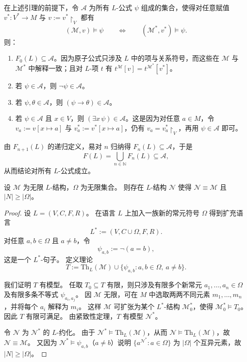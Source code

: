 \documentclass[lang=cn,a4paper,newtx,section]{elegantbook}
\begin{document}
 \begin{remark}
 在上述引理的前提下，令 $\mathcal A$ 为所有 $L$-公式 $\psi$ 组成的集合，使得对任意赋值 $v^*:V^*\to M$ 与 $v:=v^*\!\restriction_V$ 都有
 \[
   (\mathcal M,v)\models\psi\qquad\Longleftrightarrow\qquad(\mathcal M^*,v^*)\models\psi.
 \]
 则：
 \begin{enumerate}
   \item $F_0(L)\subseteq\mathcal A$。因为原子公式只涉及 $L$ 中的项与关系符号，而这些在 $\mathcal M$ 与 $\mathcal M^*$ 中解释一致；且对 $L$-项 $t$ 有 $t^{\mathcal M}[v]=t^{\mathcal M^*}[v^*]$。
   \item 若 $\psi\in\mathcal A$，则 $\neg\psi\in\mathcal A$。
   \item 若 $\psi,\theta\in\mathcal A$，则 $(\psi\to\theta)\in\mathcal A$。
   \item 若 $\psi\in\mathcal A$ 且 $x\in V$，则 $(\exists x\,\psi)\in\mathcal A$。这是因为对任意 $a\in M$，令 $v_a:=v[x\mapsto a]$ 与 $v^*_a:=v^*[x\mapsto a]$，仍有 $v_a=v^*_a\!\restriction_V$，再用 $\psi\in\mathcal A$ 即可。
 \end{enumerate}
 由 $F_{n+1}(L)$ 的递归定义，易对 $n$ 归纳得 $F_n(L)\subseteq\mathcal A$，于是
 \[
   F(L)=\bigcup_{n\in\mathbb N}F_n(L)\subseteq\mathcal A,
 \]
 从而结论对所有 $L$-公式成立。
 \end{remark}

 \begin{lemma}
 \label{exist-large-elementary-equivalent-model}
 设 $\mathcal M$ 为无限 $L$-结构，$\Omega$ 为无限集合。
 则存在 $L$-结构 $\mathcal N$ 使得 $\mathcal N\equiv\mathcal M$ 且 $\lvert N\rvert\ge\lvert\Omega\rvert$。
 \end{lemma}

 \begin{proof}
 设 $L=(V,C,F,R)$。
 在语言 $L$ 上加入一族新的常元符号 $\Omega$ 得到扩充语言
 \[
   L^*:=(V,C\cup\Omega,F,R).
 \]
 对任意 $a,b\in\Omega$ 且 $a\neq b$，令
 \[
   \psi_{a,b}:=\neg(a=b),
 \]
 这是一个 $L^*$-句子。
 定义理论
 \[
   T:=\mathrm{Th}_L(\mathcal M)\cup\{\psi_{a,b}:a,b\in\Omega,\ a\neq b\}.
 \]

 我们证明 $T$ 有模型。
 任取 $T_0\subseteq T$ 有限，则只涉及有限多个新常元 $a_1,\dots,a_n\in\Omega$ 及有限多条不等式 $\psi_{a_i,a_j}$。
 因 $\mathcal M$ 无限，可在 $M$ 中选取两两不同元素 $m_1,\dots,m_n$，并将每个 $a_i$ 解释为 $m_i$。
 这样 $\mathcal M$ 可扩张为某个 $L^*$-结构 $\mathcal M_0^*$，使得 $\mathcal M_0^*\models T_0$。
 因此 $T$ 有限可满足。
 由紧致性定理，$T$ 有模型 $\mathcal N^*$。

 令 $\mathcal N$ 为 $\mathcal N^*$ 的 $L$-约化。
 由于 $\mathcal N^*\models\mathrm{Th}_L(\mathcal M)$，从而 $\mathcal N\models\mathrm{Th}_L(\mathcal M)$，故 $\mathcal N\equiv\mathcal M$。
 又因为 $\mathcal N^*\models\psi_{a,b}$（$a\neq b$）说明 $\{a^{\mathcal N^*}:a\in\Omega\}$ 为 $\lvert\Omega\rvert$ 个互异元素，故 $\lvert N\rvert\ge\lvert\Omega\rvert$。
 \end{proof}
\end{document}
